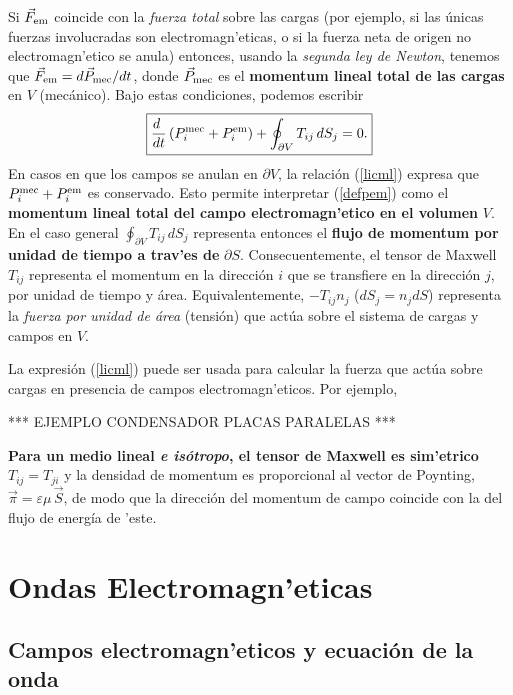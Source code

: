 Si $\vec{F}_{\rm em}$ coincide con la \textit{fuerza total} sobre las cargas (por ejemplo, si las únicas fuerzas involucradas son electromagn'eticas, o si la fuerza neta de origen no electromagn'etico se anula) entonces, usando la \textit{segunda ley de Newton}, tenemos que $\vec{F}_{\rm em}=d\vec{P}_{\rm mec}/dt$, donde $\vec{P}_{\rm mec}$ es el \textbf{momentum lineal total de las cargas} en $V$ (mecánico). Bajo estas condiciones, podemos escribir
\begin{equation}
\boxed{\frac{d\ }{dt}\left(P_i^{\rm mec}+P_i^{\rm em}\right)+\oint_{\partial
V}T_{ij}\,dS_j =0.} \label{licml}
\end{equation}
En casos en que los campos se anulan en $\partial V$, la relación
(\ref{licml}) expresa que $P_i^{\rm mec}+P_i^{\rm em}$ es conservado. Esto
permite interpretar (\ref{defpem}) como el \textbf{momentum lineal total del
campo electromagn'etico en el volumen} $V$. En el caso general $\oint_{\partial
V}T_{ij}\,dS_j $ representa entonces el \textbf{flujo de momentum por unidad de tiempo
a trav'es de} $\partial S$. Consecuentemente, el tensor de Maxwell $T_{ij}$
representa el momentum en la dirección $i$ que se transfiere en la dirección
$j$, por unidad de tiempo y área. Equivalentemente, $-T_{ij}n_j$ ($dS_j=n_jdS$)
representa la \textit{fuerza por unidad de área} (tensión) que actúa sobre el sistema
de cargas y campos en $V$.

La expresión (\ref{licml}) puede ser usada para calcular la fuerza que actúa
sobre cargas en presencia de campos electromagn'eticos. Por ejemplo,

\begin{center}
*** EJEMPLO CONDENSADOR PLACAS PARALELAS ***
\end{center}

\textbf{Para un medio lineal \textit{e isótropo}, el tensor de Maxwell es sim'etrico
$T_{ij}=T_{ji}$} y la densidad de momentum es proporcional al vector de
Poynting, $\vec{\pi}=\varepsilon\mu\,\vec{S}$, de modo que la dirección del
momentum de campo coincide con la del flujo de energía de
'este.

\section{Ondas Electromagn'eticas}

\subsection{Campos electromagn'eticos y ecuación de la onda}

